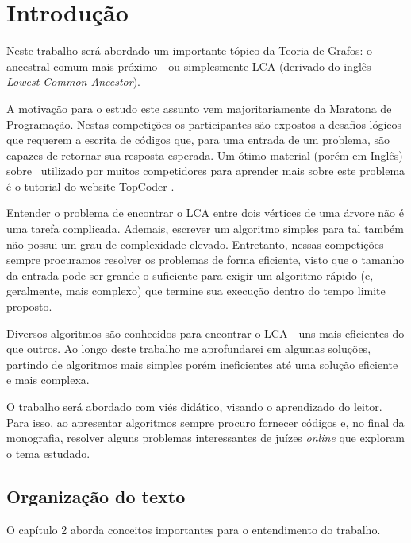 \chapter{Introdução}
\label{cap:introducao}


Neste trabalho será abordado um importante tópico da Teoria de Grafos: o ancestral comum mais próximo - ou simplesmente LCA (derivado do inglês \emph{Lowest Common 
Ancestor}).

A motivação para o estudo este assunto vem majoritariamente da Maratona de Programação. Nestas competições os participantes  são expostos a desafios lógicos que requerem a escrita de códigos que, para uma entrada de um problema, são capazes de retornar sua resposta esperada. Um ótimo material (porém em Inglês) sobre \LCA\ utilizado por muitos competidores para aprender mais sobre este problema é o tutorial do website TopCoder \cite{top-coder}.

Entender o problema de encontrar o LCA entre dois vértices de uma árvore não é uma 
tarefa complicada. Ademais, escrever um algoritmo simples para tal também não possui 
um grau de complexidade elevado. Entretanto, nessas competições sempre procuramos 
resolver os problemas de forma eficiente, visto que o tamanho da entrada pode ser 
grande o suficiente para exigir um algoritmo rápido (e, geralmente, mais complexo) 
que termine sua execução dentro do tempo limite proposto.

Diversos algoritmos são conhecidos para encontrar o LCA - uns mais eficientes do 
que outros. Ao longo deste trabalho me aprofundarei em algumas soluções, partindo 
de algoritmos mais simples porém ineficientes até uma solução eficiente e mais complexa.

O trabalho será abordado com viés didático, visando o aprendizado do leitor. 
Para isso, ao apresentar algoritmos sempre procuro fornecer códigos e, no final da
monografia, resolver alguns problemas interessantes de juízes \emph{online} que 
exploram o tema estudado.


\section{Organização do texto}

O capítulo 2 aborda conceitos importantes para o entendimento do trabalho.

\vspace{0.2cm}

